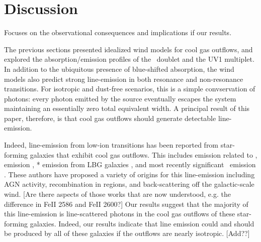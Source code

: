 \documentclass[12pt,preprint]{aastex}
\begin{document}
%     
%
     

\section{Discussion}
\label{sec:discuss}

Focuses on the observational consequences and implications if our results. 

The previous sections presented idealized wind models for
cool gas outflows, and explored the absorption/emission profiles of
the \mgiid\ doublet and the  UV1 multiplet.  In addition to
the ubiquitous presence of blue-shifted absorption, the wind models
also predict strong line-emission in both resonance
and non-resonance transitions.  For isotropic and dust-free scenarios,
this is a simple convservation of photons: every photon emitted by
the source eventually escapes the system maintaining an essentially
zero total equivalent width. A principal result of this paper,
therefore, is that cool gas outflows should generate detectable 
line-emission.
 
Indeed, line-emission from low-ion transitions has been reported from 
star-forming galaxies that exhibit cool gas outflows.  
This includes emission related to  \citep{phillips,chen},
 emission \citep{wcp+09,rwk+10}, 
* emission from LBG galaxies \citep{shapley03},
and most recently significant \feiis\ emission \citep{rubin+10c}. 
These authors have proposed a variety of origins for this
line-emission including AGN activity, recombination in 
regions, and back-scattering off the galactic-scale wind.
[Are there aspects of those works that are now understood, e.g. the
difference in FeII 2586 and FeII 2600?]
Our results suggest that the majority of this line-emission is 
line-scattered photons in the cool gas outflows of these star-forming
galaxies.  Indeed, our results indicate that line emission could and
should be produced by all of these galaxies if the outflows 
are nearly isotropic. [Add??]
\end{document}
